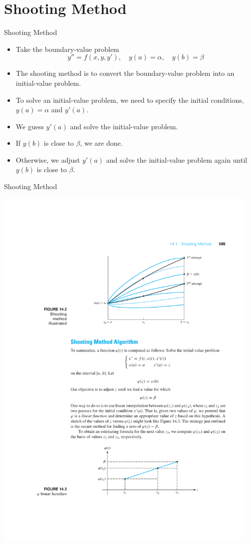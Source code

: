 \documentclass{beamer}
\begin{document}
\section{Shooting Method}
\begin{frame}{Shooting Method}
    \begin{itemize}
        \item Take the boundary-value problem
        \[
    y'' = f(x, y, y'), \quad y(a) = \alpha, \quad y(b) = \beta
    \]
    \item The shooting method is to convert the boundary-value problem into an initial-value problem.
    \item To solve an initial-value problem, we need to specify the initial conditions, $y(a)=\alpha$ and $y'(a)$.
    \item We guess $y'(a)$ and solve the initial-value problem.
    \item If $y(b)$ is close to $\beta$, we are done.
    \item Otherwise, we adjust $y'(a)$ and solve the initial-value problem again until $y(b)$ is close to $\beta$.
    \end{itemize}
\end{frame}
\begin{frame}{Shooting Method}
    \centerline{\includegraphics[width=0.95\textwidth]{ShootingMethod.pdf}}

\end{frame}
\end{document}
